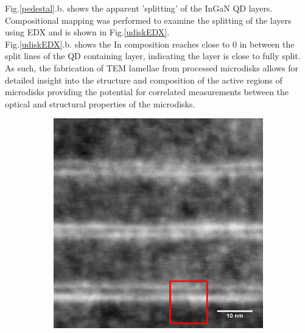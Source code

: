 \FloatBarrier
\squeezeup
Fig.\ref{pedestal}.b. shows the apparent 'splitting' of the InGaN QD layers. Compositional mapping was performed to examine the splitting of the layers using EDX and is shown in Fig.\ref{udiskEDX}.\\
Fig.\ref{udiskEDX}.b. shows the In composition reaches close to 0 in between the split lines of the QD containing layer, indicating the layer is close to fully split. As such, the fabrication of TEM lamellae from processed microdisks allows for detailed insight into the structure and composition of the active regions of microdisks providing the potential for correlated measurements between the optical and structural properties of the microdisks.

\begin{figure}
	\begin{subfigure}[b]{0.3\textwidth}
		\centering
		\includegraphics[width=.85\linewidth]{Figs/Ch4/edxtarget}
		\caption{}
		

\end{subfigure}
\end{figure}
